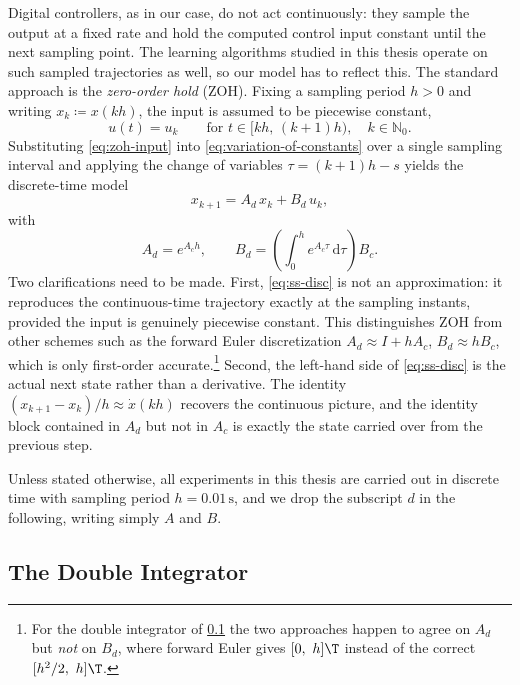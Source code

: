 Digital controllers, as in our case, do not act continuously: they sample the output at a fixed
rate and hold the computed control input constant until the next sampling point. The
learning algorithms studied in this thesis operate on such sampled trajectories
as well, so our model has to reflect this. The standard approach is the
\emph{zero-order hold} (ZOH). Fixing a sampling period $h > 0$ and writing
$x_k \coloneqq x(kh)$, the input is assumed to be piecewise constant,
\begin{equation}
    \label{eq:zoh-input}
    u(t) = u_k \qquad \text{for } t \in [kh,\, (k+1)h), \quad k \in \mathbb{N}_0 .
\end{equation}
Substituting \eqref{eq:zoh-input} into \eqref{eq:variation-of-constants} over a
single sampling interval and applying the change of variables
$\tau = (k+1)h - s$ yields the discrete-time model
\begin{equation}
    \label{eq:ss-disc}
    x_{k+1} = A_d\, x_k + B_d\, u_k ,
\end{equation}
with
\begin{equation}
    \label{eq:zoh-matrices}
    A_d = e^{A_c h},
    \qquad
    B_d = \left( \int_{0}^{h} e^{A_c \tau} \, \mathrm{d}\tau \right) B_c .
\end{equation}
Two clarifications need to be made. First, \eqref{eq:ss-disc} is not an approximation: it
reproduces the continuous-time trajectory exactly at the sampling
instants, provided the input is genuinely piecewise constant. This distinguishes
ZOH from other schemes such as the forward Euler discretization
$A_d \approx I + h A_c$, $B_d \approx h B_c$, which is only first-order
accurate.\footnote{For the double integrator of
\cref{subsec:double-integrator} the two approaches happen to agree on $A_d$ but
\emph{not} on $B_d$, where forward Euler gives $[0,\ h]\T$ instead of the
correct $[h^2/2,\ h]\T$.} Second, the left-hand side of \eqref{eq:ss-disc} is the actual next
state rather than a derivative. The identity
$(x_{k+1} - x_k)/h \approx \dot{x}(kh)$ recovers the continuous picture, and the
identity block contained in $A_d$ but not in $A_c$ is exactly the state carried
over from the previous step.
 
Unless stated otherwise, all experiments in this thesis are carried out in
discrete time with sampling period $h = 0.01\,\mathrm{s}$, and
we drop the subscript $d$ in the following, writing simply $A$ and $B$.
 
\subsection{The Double Integrator}
\label{subsec:double-integrator}
 
